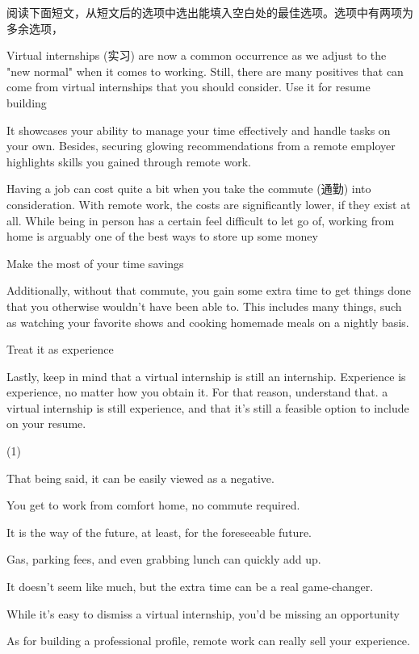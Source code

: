 \documentclass{英语试卷}
\begin{document}
\par 阅读下面短文，从短文后的选项中选出能填入空白处的最佳选项。选项中有两项为多余选项，\par
\par Virtual internships (实习) are now a common occurrence as we adjust to the "new normal" when it comes to working.  Still, there are many positives that can come from virtual internships that you should consider. Use it for resume building\par
\par {} It showcases your ability to manage your time effectively and handle tasks on your own. Besides, securing glowing recommendations from a remote employer highlights skills you gained through remote work.\par
\par Having a job can cost quite a bit when you take the commute (通勤) into consideration. With remote work, the costs are significantly lower, if they exist at all.  While being in person has a certain feel difficult to let go of, working from home is arguably one of the best ways to store up some money\par
\par Make the most of your time savings\par
\par Additionally, without that commute, you gain some extra time to get things done that you otherwise wouldn't have been able to. This includes many things, such as watching your favorite shows and cooking homemade meals on a nightly basis. \par
\par Treat it as experience\par
\par Lastly, keep in mind that a virtual internship is still an internship. Experience is experience, no matter how you obtain it.  For that reason, understand that. a virtual internship is still experience, and that it's still a feasible option to include on your resume.\par
\begin{choices}(1)
  \item That being said, it can be easily viewed as a negative.
  \item You get to work from comfort home, no commute required.
  \item It is the way of the future, at least, for the foreseeable future.
  \item Gas, parking fees, and even grabbing lunch can quickly add up.
  \item It doesn't seem like much, but the extra time can be a real game-changer.
  \item While it's easy to dismiss a virtual internship, you'd be missing an opportunity
  \item As for building a professional profile, remote work can really sell your experience.
\end{choices}
\end{document}

